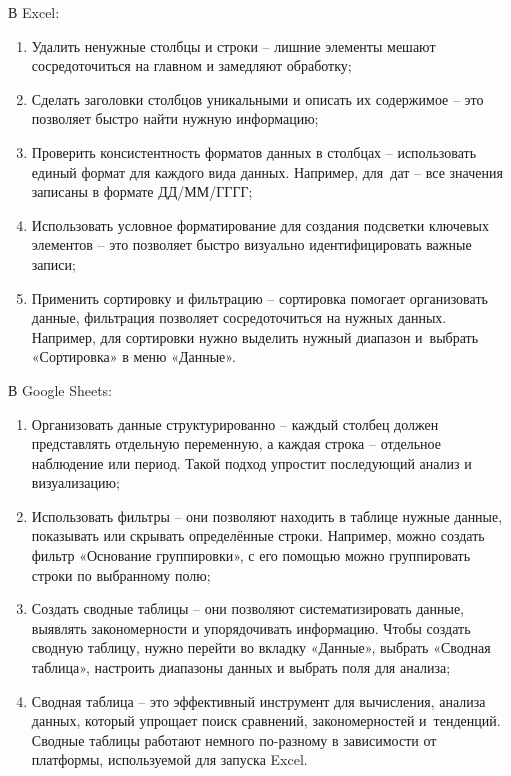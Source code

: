 \documentclass{ou}
\begin{document}
В Excel:
\begin{enumerate}[leftmargin=0em, itemindent=3.75em, nosep, label=\arabic*)]
\item Удалить ненужные столбцы и строки -- лишние элементы мешают сосредоточиться на главном и замедляют обработку;
\item Сделать заголовки столбцов уникальными и описать их содержимое -- это позволяет быстро найти нужную информацию;
\item Проверить консистентность форматов данных в столбцах -- использовать единый формат для каждого вида данных. Например, для~дат -- все значения записаны в формате ДД/ММ/ГГГГ;
\item Использовать условное форматирование для создания подсветки ключевых элементов -- это позволяет быстро визуально идентифицировать важные записи;
\item Применить сортировку и фильтрацию -- сортировка помогает организовать данные, фильтрация позволяет сосредоточиться на нужных данных. Например, для сортировки нужно выделить нужный диапазон и~выбрать «Сортировка» в меню «Данные».
\end{enumerate}

В Google Sheets:
\begin{enumerate}[leftmargin=0em, itemindent=3.75em, nosep, label=\arabic*)]
\item Организовать данные структурированно -- каждый столбец должен представлять отдельную переменную, а каждая строка -- отдельное наблюдение или период. Такой подход упростит последующий анализ и визуализацию;
\item Использовать фильтры -- они позволяют находить в таблице нужные данные, показывать или скрывать определённые строки. Например, можно создать фильтр «Основание группировки», с его помощью можно группировать строки по выбранному полю;
\item Создать сводные таблицы -- они позволяют систематизировать данные, выявлять закономерности и упорядочивать информацию. Чтобы создать сводную таблицу, нужно перейти во вкладку «Данные», выбрать «Сводная таблица», настроить диапазоны данных и выбрать поля для анализа;
\item Сводная таблица -- это эффективный инструмент для вычисления, анализа данных, который упрощает поиск сравнений, закономерностей и~тенденций. Сводные таблицы работают немного по-разному в зависимости от платформы, используемой для запуска Excel.
\end{enumerate}
\end{document}
